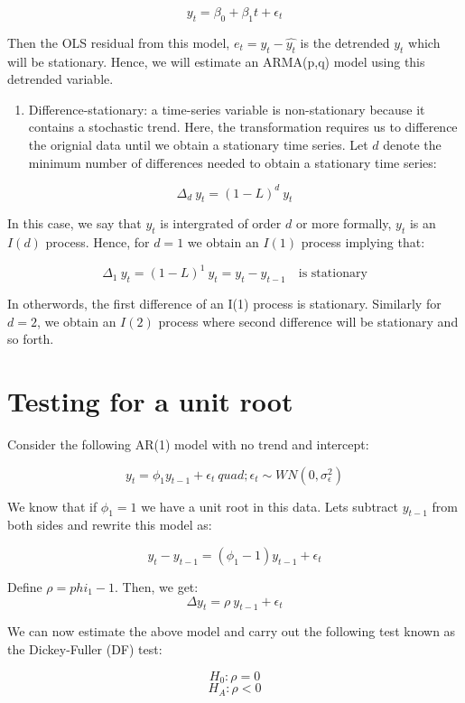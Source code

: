 \documentclass[]{book}
\providecommand{\tightlist}{%
  \setlength{\itemsep}{0pt}\setlength{\parskip}{0pt}}
\theoremstyle{definition}
\theoremstyle{definition}
\theoremstyle{definition}
\theoremstyle{remark}
\begin{document}
\[y_t = \beta_0 +\beta_1 t +\epsilon_t\]

Then the OLS residual from this model, \(e_t=y_t-\hat{y_t}\) is the detrended \(y_t\) which will be stationary. Hence, we will estimate an ARMA(p,q) model using this detrended variable.

\begin{enumerate}
\def\labelenumi{\arabic{enumi}.}
\setcounter{enumi}{1}
\tightlist
\item
  Difference-stationary: a time-series variable is non-stationary because it contains a stochastic trend. Here, the transformation requires us to difference the orignial data until we obtain a stationary time series. Let \(d\) denote the minimum number of differences needed to obtain a stationary time series:
\end{enumerate}

\[\Delta_d \ y_t=(1-L)^d \ y_t\]

In this case, we say that \(y_t\) is intergrated of order \(d\) or more formally, \(y_t\) is an \(I(d)\) process. Hence, for \(d=1\) we obtain an \(I(1)\) process implying that:

\[\Delta_1 \ y_t=(1-L)^1 \ y_t=y_t-y_{t-1} \quad  \text{is stationary}\]

In otherwords, the first difference of an I(1) process is stationary. Similarly for \(d=2\), we obtain an \(I(2)\) process where second difference will be stationary and so forth.

\hypertarget{testing-for-a-unit-root}{%
\section{Testing for a unit root}\label{testing-for-a-unit-root}}

Consider the following AR(1) model with no trend and intercept:

\[y_t=\phi_1 y_{t-1} +\epsilon_t  \ quad ; \epsilon_t\sim WN(0,\sigma^2_\epsilon)\]

We know that if \(\phi_1=1\) we have a unit root in this data. Lets subtract \(y_{t-1}\) from both sides and rewrite this model as:

\[y_t-y_{t-1}= (\phi_1-1)y_{t-1}+\epsilon_t \]

Define \(\rho=phi_1-1\). Then, we get:
\[\Delta y_t= \rho \ y_{t-1}+\epsilon_t \]

We can now estimate the above model and carry out the following test known as the Dickey-Fuller (DF) test:

\[H_0: \rho=0 \]
\[H_A: \rho<0\]
\end{document}
